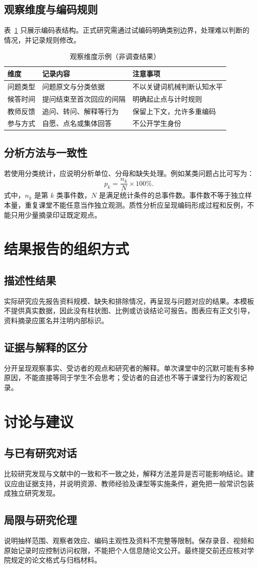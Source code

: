 \subsection{观察维度与编码规则}
表~\ref{tab:coding} 只展示编码表结构。正式研究需通过试编码明确类别边界，处理难以判断的情况，并记录规则修改。
\begin{table}[htbp]\centering\caption{观察维度示例（非调查结果）}\label{tab:coding}
\begin{tabularx}{\linewidth}{lXX}\toprule 维度 & 记录内容 & 注意事项\\\midrule
问题类型 & 问题原文与分类依据 & 不以关键词机械判断认知水平\\
候答时间 & 提问结束至首次回应的间隔 & 明确起止点与计时规则\\
教师反馈 & 追问、转问、解释等行为 & 保留上下文，允许多重编码\\
参与方式 & 自愿、点名或集体回答 & 不公开学生身份\\\bottomrule\end{tabularx}
\end{table}
\subsection{分析方法与一致性}
若使用分类统计，应说明分析单位、分母和缺失处理。例如某类问题占比可写为：
\begin{equation}\label{eq:proportion}p_k=\frac{n_k}{N}\times100\%.\end{equation}
式中，$n_k$ 是第 $k$ 类事件数，$N$ 是满足统计条件的总事件数。事件数不等于独立样本量，重复课堂不能任意当作独立观测。质性分析应呈现编码形成过程和反例，不能只用少量摘录印证既定观点。
\section{结果报告的组织方式}
\subsection{描述性结果}
实际研究应先报告资料规模、缺失和排除情况，再呈现与问题对应的结果。本模板不提供真实数据，因此没有柱状图、比例或访谈结论可报告。图表应有正文引导，资料摘录应匿名并注明内部标识。
\subsection{证据与解释的区分}
分开呈现观察事实、受访者的观点和研究者的解释。单次课堂中的沉默可能有多种原因，不能直接等同于学生不会思考；受访者的自述也不等于课堂行为的客观记录。
\section{讨论与建议}
\subsection{与已有研究对话}
比较研究发现与文献中的一致和不一致之处，解释方法差异是否可能影响结论。建议应由证据支持，并说明资源、教师经验及课型等实施条件，避免把一般常识包装成独立研究发现。
\subsection{局限与研究伦理}
说明抽样范围、观察者效应、编码主观性及资料不完整等限制。保存录音、视频和原始记录时应控制访问权限，不能把个人信息随论文公开。最终提交前还应核对学院规定的论文格式与归档材料。
